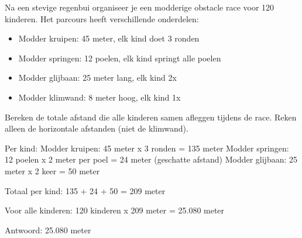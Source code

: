 \begin{opgave}
Na een stevige regenbui organiseer je een modderige obstacle race voor 120 kinderen.
Het parcours heeft verschillende onderdelen:

\begin{itemize}
\item Modder kruipen: 45 meter, elk kind doet 3 ronden
\item Modder springen: 12 poelen, elk kind springt alle poelen
\item Modder glijbaan: 25 meter lang, elk kind 2x
\item Modder klimwand: 8 meter hoog, elk kind 1x
\end{itemize}

Bereken de totale afstand die alle kinderen samen afleggen tijdens de race.
Reken alleen de horizontale afstanden (niet de klimwand).
\end{opgave}

\begin{oplossing}
Per kind:
Modder kruipen: 45 meter x 3 ronden = 135 meter
Modder springen: 12 poelen x 2 meter per poel = 24 meter (geschatte afstand)
Modder glijbaan: 25 meter x 2 keer = 50 meter

Totaal per kind: 135 + 24 + 50 = 209 meter

Voor alle kinderen: 120 kinderen x 209 meter = 25.080 meter

Antwoord: 25.080 meter
\end{oplossing}